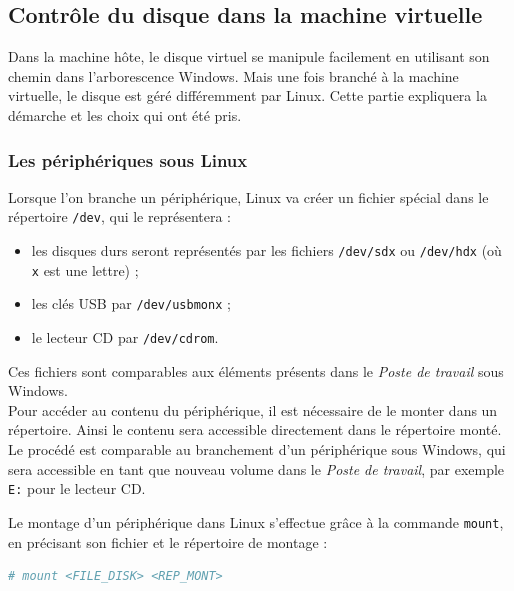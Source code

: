 \subsection{Contrôle du disque dans la machine virtuelle}
\label{Contrôle du disque dans la machine virtuelle}

Dans la machine hôte, le disque virtuel se manipule facilement en utilisant son chemin dans l'arborescence Windows.
Mais une fois branché à la machine virtuelle, le disque est géré différemment par Linux.
Cette partie expliquera la démarche et les choix qui ont été pris.
\\




\subsubsection{Les périphériques sous Linux}
\label{Les périphériques sous Linux}

Lorsque l'on branche un périphérique, Linux va créer un fichier spécial dans le répertoire \lstinline{/dev}, qui le représentera :
\begin{itemize}
	\item les disques durs seront représentés par les fichiers \lstinline{/dev/sdx} ou \lstinline{/dev/hdx} (où \lstinline{x} est une lettre) ;
	\item les clés USB par \lstinline{/dev/usbmonx} ;
	\item le lecteur CD par \lstinline{/dev/cdrom}.
\end{itemize}
Ces fichiers sont comparables aux éléments présents dans le \textit{Poste de travail} sous Windows.
\\


Pour accéder au contenu du périphérique, il est nécessaire de le monter dans un répertoire.
Ainsi le contenu sera accessible directement dans le répertoire monté.
Le procédé est comparable au branchement d'un périphérique sous Windows, qui sera accessible en tant que nouveau volume dans le \textit{Poste de travail}, par exemple \lstinline{E:} pour le lecteur CD.

Le montage d'un périphérique dans Linux s'effectue grâce à la commande \lstinline{mount}, en précisant son fichier et le répertoire de montage :
\begin{lstlisting}[language = sh]
# mount <FILE_DISK> <REP_MONT>
\end{lstlisting}
~~\\


